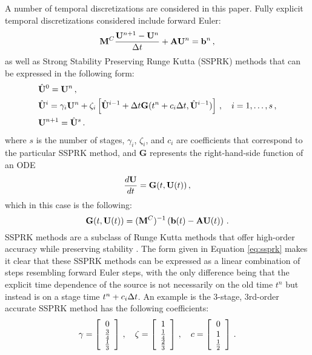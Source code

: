 A number of temporal discretizations are considered in this paper.
Fully explicit temporal discretizations considered include forward Euler:
\begin{equation}
  \mathbf{M}^C\frac{\mathbf{U}^{n+1}-\mathbf{U}^n}{\Delta t} + \mathbf{A}\mathbf{U}^n = \mathbf{b}^n \,,
\end{equation}
as well as Strong Stability Preserving Runge Kutta (SSPRK) methods that
can be expressed in the following form:
\begin{subequations}\label{eq:ssprk}
\begin{align}
  & \hat{\mathbf{U}}^0 = \mathbf{U}^n \,, \\
  & \hat{\mathbf{U}}^i = \gamma_i \mathbf{U}^n + \zeta_i \left[
      \hat{\mathbf{U}}^{i-1}
      + \Delta t\mathbf{G}(t^n+c_i\Delta t, \hat{\mathbf{U}}^{i-1})\right]
    \,, \quad
    i = 1,\ldots,s
    \,, \\
  & \mathbf{U}^{n+1} = \hat{\mathbf{U}}^s \,.
\end{align}
\end{subequations}
where $s$ is the number of stages, $\gamma_i$, $\zeta_i$, and $c_i$ are
coefficients that correspond to the particular SSPRK method, and
$\mathbf{G}$ represents the right-hand-side function of an ODE
\begin{equation}
  \frac{d\mathbf{U}}{dt} = \mathbf{G}(t,\mathbf{U}(t)) \,,
\end{equation}
which in this case is the following:
\begin{equation}
  \mathbf{G}(t,\mathbf{U}(t)) = (\mathbf{M}^C)^{-1}
    \left(\mathbf{b}(t) - \mathbf{A}\mathbf{U}(t)\right) \,.
\end{equation}
SSPRK methods are a subclass of Runge Kutta methods that offer high-order
accuracy while preserving stability \cite{gottlieb,macdonald}.
The form given in Equation \eqref{eq:ssprk} makes it clear that these
SSPRK methods can be expressed as a linear combination of steps resembling
forward Euler steps, with the only difference being that the explicit
time dependence of the source is not necessarily on the old time $t^n$ but
instead is on a stage time $t^n + c_i\Delta t$.
An example is the 3-stage, 3rd-order accurate SSPRK
method has the following coefficients:
\begin{equation}
  \gamma = \left[\begin{array}{c}
    0\\\frac{3}{4}\\\frac{1}{3}\end{array}\right]
  \,, \quad
  \zeta = \left[\begin{array}{c}
    1\\\frac{1}{4}\\\frac{2}{3}\end{array}\right]
  \,, \quad
  c = \left[\begin{array}{c}0\\1\\\frac{1}{2}\end{array}\right] \,.
\end{equation}

